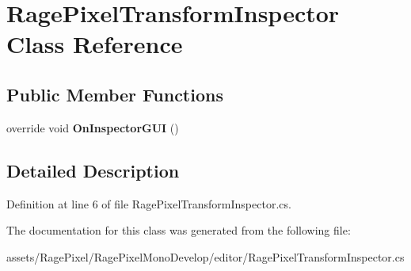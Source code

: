 \hypertarget{class_rage_pixel_transform_inspector}{\section{Rage\-Pixel\-Transform\-Inspector Class Reference}
\label{class_rage_pixel_transform_inspector}
}
\subsection*{Public Member Functions}
\begin{DoxyCompactItemize}
\item 
\hypertarget{class_rage_pixel_transform_inspector_a6727f6208136db879fbccc0976f9a834}{override void {\bfseries On\-Inspector\-G\-U\-I} ()}\label{class_rage_pixel_transform_inspector_a6727f6208136db879fbccc0976f9a834}

\end{DoxyCompactItemize}


\subsection{Detailed Description}


Definition at line 6 of file Rage\-Pixel\-Transform\-Inspector.\-cs.



The documentation for this class was generated from the following file\-:\begin{DoxyCompactItemize}
\item 
assets/\-Rage\-Pixel/\-Rage\-Pixel\-Mono\-Develop/editor/Rage\-Pixel\-Transform\-Inspector.\-cs\end{DoxyCompactItemize}
